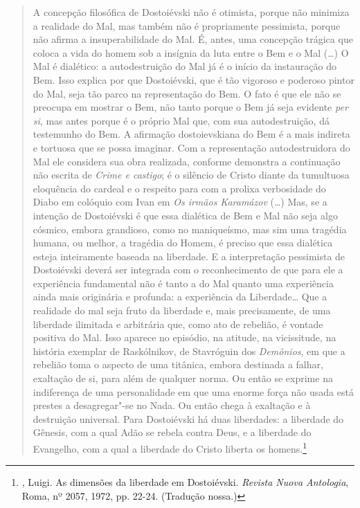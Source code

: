 \begin{quotation}
A concepção filosófica de Dostoiévski não é otimista, porque não
minimiza a realidade do Mal, mas também não é propriamente pessimista,
porque não afirma a insuperabilidade do Mal. É, antes, uma concepção
trágica que coloca a vida do homem sob a insígnia da luta entre o Bem e
o Mal (\ldots{}) O Mal é dialético: a autodestruição do Mal já é o início da
instauração do Bem. Isso explica por que Dostoiévski, que é tão vigoroso
e poderoso pintor do Mal, seja tão parco na representação do Bem. O fato
é que ele não se preocupa em mostrar o Bem, não tanto porque o Bem já
seja evidente \emph{per si}, mas antes porque é o próprio Mal que,
com sua autodestruição, dá testemunho do Bem. A afirmação
dostoievskiana do Bem é a mais indireta e tortuosa que se possa
imaginar. Com a representação autodestruidora do Mal ele considera sua
obra realizada, conforme demonstra a continuação não escrita de
\emph{Crime e castigo}; é o silêncio de Cristo diante da tumultuosa
eloquência do cardeal e o respeito para com a prolixa verbosidade do
Diabo em colóquio com Ivan em \emph{Os irmãos Karamázov} (\ldots{}) Mas, se a
intenção de Dostoiévski é que essa dialética de Bem e Mal não seja algo
cósmico, embora grandioso, como no maniqueísmo, mas sim uma tragédia
humana, ou melhor, a tragédia do Homem, é preciso que essa dialética
esteja inteiramente baseada na liberdade. E a interpretação pessimista
de Dostoiévski deverá ser integrada com o reconhecimento de que para ele
a experiência fundamental não é tanto a do Mal quanto uma experiência
ainda mais originária e profunda: a experiência da Liberdade\ldots{} Que a
realidade do mal seja fruto da liberdade e, mais precisamente, de uma
liberdade ilimitada e arbitrária que, como ato de rebelião, é vontade
positiva do Mal. Isso aparece no episódio, na atitude, na vicissitude,
na história exemplar de Raskólnikov, de Stavróguin dos \emph{Demônios},
em que a rebelião toma o aspecto de uma titânica, embora destinada a
falhar, exaltação de si, para além de qualquer norma. Ou então se
exprime na indiferença de uma personalidade em que uma enorme força não
usada está prestes a desagregar"-se no Nada. Ou então chega à exaltação e
à destruição universal. Para Dostoiévski há duas liberdades: a liberdade
do Gênesis, com a qual Adão se rebela contra Deus, e a liberdade do
Evangelho, com a qual a liberdade do Cristo liberta os homens.\footnote{,
  Luigi. As dimensões da liberdade em Dostoiévski. \emph{Revista Nuova
  Antologia}, Roma, nº 2057, 1972, pp. 22-24. (Tradução nossa.)}
\end{quotation}


